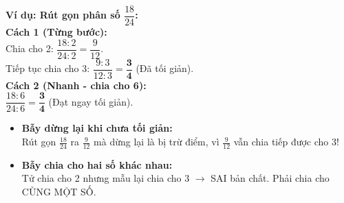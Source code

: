 \documentclass[14pt,a4paper,oneside]{extbook}
\begin{document}
\vspace{-2.5mm}
\noindent
\begin{minipage}[t]{0.49\textwidth}\vspace{0pt}
\begin{tcolorbox}[
  enhanced,
  colback=green!4!white,
  colframe=green!60!black,
  arc=2mm, boxrule=0.8pt,
  left=2mm, right=2mm, top=1.8mm, bottom=1.8mm,
  title={\footnotesize\bfseries\color{white}\faCheckCircle\ Ví dụ thực hành chuẩn mực}
]
{\footnotesize
\textbf{Ví dụ: Rút gọn phân số $\dfrac{18}{24}$:}\\
\textbf{Cách 1 (Từng bước):}\\
Chia cho 2: $\dfrac{18 : 2}{24 : 2} = \dfrac{9}{12}$.\\
Tiếp tục chia cho 3: $\dfrac{9 : 3}{12 : 3} = \mathbf{\dfrac{3}{4}}$ (Đã tối giản).\\
\textbf{Cách 2 (Nhanh - chia cho 6):}\\
$\dfrac{18 : 6}{24 : 6} = \mathbf{\dfrac{3}{4}}$ (Đạt ngay tối giản).
}
\end{tcolorbox}
\end{minipage}
\hfill
\begin{minipage}[t]{0.49\textwidth}\vspace{0pt}
\begin{tcolorbox}[
  enhanced,
  colback=red!4!white,
  colframe=red!70!black,
  arc=2mm, boxrule=0.8pt,
  left=2mm, right=2mm, top=1.8mm, bottom=1.8mm,
  title={\footnotesize\bfseries\color{white}\faExclamationTriangle\ Mẹo tránh bẫy trắc nghiệm}
]
{\footnotesize
\begin{itemize}\setlength{\itemsep}{1.5pt}\setlength{\leftskip}{-2.5mm}
  \item \textbf{Bẫy dừng lại khi chưa tối giản:}\\
  Rút gọn $\frac{18}{24}$ ra $\frac{9}{12}$ mà dừng lại là bị trừ điểm, vì $\frac{9}{12}$ vẫn chia tiếp được cho 3!
  \item \textbf{Bẫy chia cho hai số khác nhau:}\\
  Tử chia cho 2 nhưng mẫu lại chia cho 3 $\to$ SAI bản chất. Phải chia cho CÙNG MỘT SỐ.
\end{itemize}
}
\end{tcolorbox}
\end{minipage}
\end{document}
